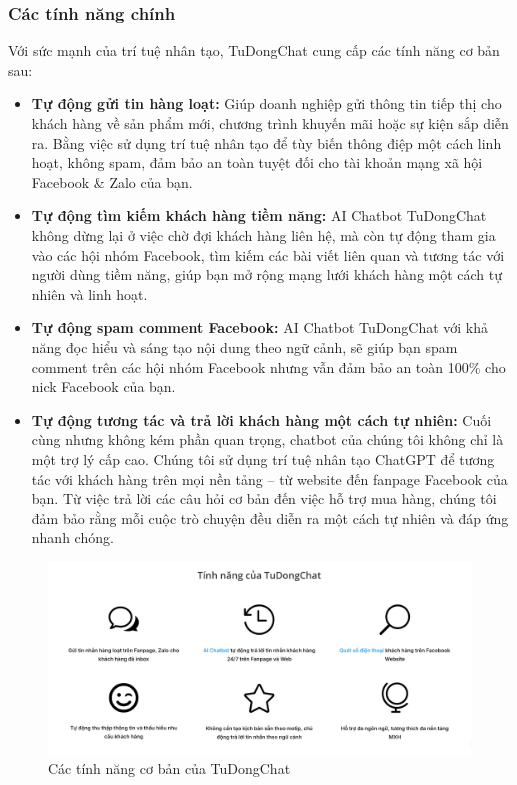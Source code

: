 \subsubsection{Các tính năng chính}
Với sức mạnh của trí tuệ nhân tạo, TuDongChat cung cấp các tính năng cơ bản sau:
\begin{itemize}
    \item \textbf{Tự động gửi tin hàng loạt:} Giúp doanh nghiệp gửi thông tin tiếp thị cho khách hàng về sản phẩm mới, chương trình khuyến mãi hoặc sự kiện sắp diễn ra. Bằng việc sử dụng trí tuệ nhân tạo để tùy biến thông điệp một cách linh hoạt, không spam, đảm bảo an toàn tuyệt đối cho tài khoản mạng xã hội Facebook \& Zalo của bạn.
    \item \textbf{Tự động tìm kiếm khách hàng tiềm năng:} AI Chatbot TuDongChat không dừng lại ở việc chờ đợi khách hàng liên hệ, mà còn tự động tham gia vào các hội nhóm Facebook, tìm kiếm các bài viết liên quan và tương tác với người dùng tiềm năng, giúp bạn mở rộng mạng lưới khách hàng một cách tự nhiên và linh hoạt.
    \item \textbf{Tự động spam comment Facebook:} AI Chatbot TuDongChat với khả năng đọc hiểu và sáng tạo nội dung theo ngữ cảnh, sẽ giúp bạn spam comment trên các hội nhóm Facebook nhưng vẫn đảm bảo an toàn 100\% cho nick Facebook của bạn.
    \item \textbf{Tự động tương tác và trả lời khách hàng một cách tự nhiên:} Cuối cùng nhưng không kém phần quan trọng, chatbot của chúng tôi không chỉ là một trợ lý cấp cao. Chúng tôi sử dụng trí tuệ nhân tạo ChatGPT để tương tác với khách hàng trên mọi nền tảng – từ website đến fanpage Facebook của bạn. Từ việc trả lời các câu hỏi cơ bản đến việc hỗ trợ mua hàng, chúng tôi đảm bảo rằng mỗi cuộc trò chuyện đều diễn ra một cách tự nhiên và đáp ứng nhanh chóng.
\end{itemize}
\begin{figure}[H]
    \centering
    \includegraphics[width=1\linewidth]{Images/tinhnangtudongchat.png}
    \vspace{0.5cm}
    \caption{Các tính năng cơ bản của TuDongChat}
    \label{fig:enter-label}
\end{figure}
